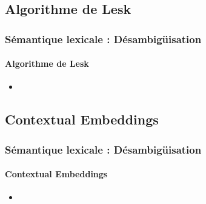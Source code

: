 \documentclass[xcolor=table]{beamer}
\begin{document}
\subsection{Algorithme de Lesk}

\begin{frame}
\frametitle{Sémantique lexicale : Désambigüisation}
\framesubtitle{Algorithme de Lesk}

\begin{itemize}
	\item 
\end{itemize}

\end{frame}

\subsection{Contextual Embeddings}

\begin{frame}
\frametitle{Sémantique lexicale : Désambigüisation}
\framesubtitle{Contextual Embeddings}

\begin{itemize}
	\item 
\end{itemize}

\end{frame}

\end{document}
